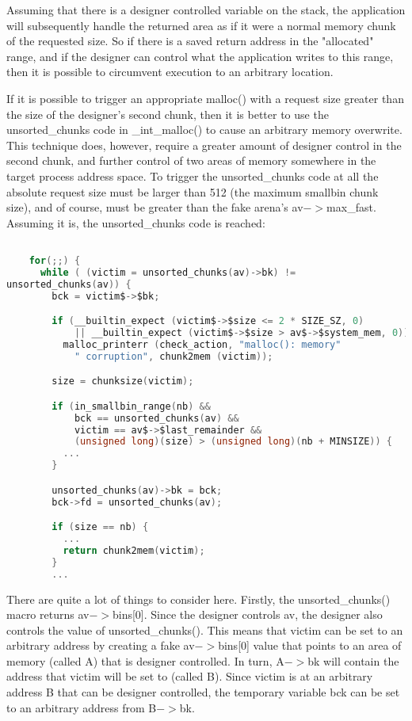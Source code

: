 \documentclass[12pt]{article}
\begin{document}
Assuming that there is a designer controlled variable on the stack,
the application will subsequently handle the returned area as if it
were a normal memory chunk of the requested size. So if there is a
saved return address in the "allocated" range, and if the designer
can control what the application writes to this range, then it is
possible to circumvent execution to an arbitrary location.
\newline


If it is possible to trigger an appropriate malloc() with a request
size greater than the size of the designer's second chunk, then it
is better to use the unsorted\_chunks code in \_int\_malloc() to cause
an arbitrary memory overwrite. This technique does, however,
require a greater amount of designer control in the second chunk,
and further control of two areas of memory somewhere in the target
process address space. To trigger the unsorted\_chunks code at all
the absolute request size must be larger than 512 (the maximum
smallbin chunk size), and of course, must be greater than the fake
arena's av$->$max\_fast. Assuming it is, the unsorted\_chunks code is
reached:
\begin{lstlisting}[language=C]

    for(;;) {
      while ( (victim = unsorted_chunks(av)->bk) !=
unsorted_chunks(av)) {
        bck = victim$->$bk;

        if (__builtin_expect (victim$->$size <= 2 * SIZE_SZ, 0)
            || __builtin_expect (victim$->$size > av$->$system_mem, 0))
          malloc_printerr (check_action, "malloc(): memory"
            " corruption", chunk2mem (victim));

        size = chunksize(victim);

        if (in_smallbin_range(nb) &&
            bck == unsorted_chunks(av) &&
            victim == av$->$last_remainder &&
            (unsigned long)(size) > (unsigned long)(nb + MINSIZE)) {
          ...
        }

        unsorted_chunks(av)->bk = bck;
        bck->fd = unsorted_chunks(av);

        if (size == nb) {
          ...
          return chunk2mem(victim);
        }
        ...
\end{lstlisting}
There are quite a lot of things to consider here. Firstly, the
unsorted\_chunks() macro returns av$->$bins[0]. Since the designer
controls av, the designer also controls the value of
unsorted\_chunks(). This means that victim can be set to an
arbitrary address by creating a fake av$->$bins[0] value that points
to an area of memory (called A) that is designer controlled. In
turn, A$->$bk will contain the address that victim will be set to
(called B). Since victim is at an arbitrary address B that can be
designer controlled, the temporary variable bck can be set to an
arbitrary address from B$->$bk.
\newline
\end{document}
